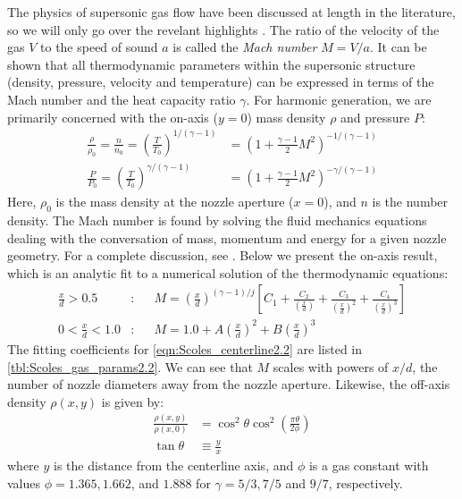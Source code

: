 The physics of supersonic gas flow have been discussed at length in the literature, so we will only go over the revelant highlights \cite{millerFreeJetSources1988}. The ratio of the velocity of the gas $V$ to the speed of sound $a$ is called the \textit{Mach number} $M=V/a$. It can be shown that all thermodynamic parameters within the supersonic structure (density, pressure, velocity and temperature) can be expressed in terms of the Mach number and the heat capacity ratio $\gamma$. For harmonic generation, we are primarily concerned with the on-axis ($y=0$) mass density $\rho$ and pressure $P$:
\begin{align}
\frac{\rho}{\rho_0} = \frac{n}{n_0} = \left(\frac{T}{T_0}\right)^{1/(\gamma-1)} &= \left(  1 + \frac{\gamma-1}{2} M^2 \right)^{-1/(\gamma-1)} \\
\frac{P}{P_0} = \left(\frac{T}{T_0}\right)^{\gamma/(\gamma-1)} &= \left(  1 + \frac{\gamma-1}{2} M^2 \right)^{-\gamma/(\gamma-1)}
\label{eqn:mach_properties}
\end{align}
Here, $\rho_0$ is the mass density at the nozzle aperture ($x=0$), and $n$ is the number density. The Mach number is found by solving the fluid mechanics equations dealing with the conversation of mass, momentum and energy for a given nozzle geometry. For a complete discussion, see \cite{millerFreeJetSources1988}. Below we present the on-axis result, which is an analytic fit to a numerical solution of the thermodynamic equations:
\begin{subequations}
	\label{eqn:Scoles_centerline2.2}
	\begin{align}
	\frac{x}{d} > 0.5&: &&M = \left( \frac{x}{d} \right)^{(\gamma-1)/j} \left[ C_1 + \frac{C_2}{\left(\frac{x}{d}\right)} + \frac{C_3}{\left(\frac{x}{d}\right)^2} + \frac{C_4}{\left(\frac{x}{d}\right)^3} \right] \label{eqn:Scoles_centerline1} \\
	0 < \frac{x}{d} < 1.0&: &&M = 1.0 + A \left( \frac{x}{d} \right)^2 + B \left( \frac{x}{d} \right)^3 \label{eqn:Scoles_centerline2}
	\end{align}
\end{subequations}
The fitting coefficients for \cref{eqn:Scoles_centerline2.2} are listed in \cref{tbl:Scoles_gas_params2.2}. We can see that $M$ scales with powers of $x/d$, the number of nozzle diameters away from the nozzle aperture. Likewise, the off-axis density $\rho(x,y)$ is given by:
\begin{align}
\frac{\rho(x,y)}{\rho(x,0)} &= \cos^2 \theta \cos^2 \left( \frac{\pi \theta}{2 \phi} \right) \\
\tan \theta &\equiv \frac{y}{x}
\label{eqn:off-axis-density}
\end{align}
where $y$ is the distance from the centerline axis, and $\phi$ is a gas constant with values ${\phi = 1.365, 1.662}$, and $1.888$ for ${\gamma = 5/3, 7/5}$ and $9/7$, respectively.

